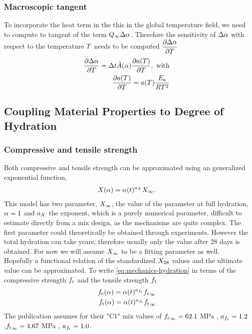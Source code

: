 \subsubsection{Macroscopic tangent}
To incorporate the heat term in the this in the global temperature field, we need to compute to tangent of the term $Q_{\infty}\Delta\alpha$.
Therefore the sensitivity of $\Delta\alpha$ with respect to the temperature $T$ needs to be computed $\dfrac{\partial \Delta\alpha}{\partial T}$
\begin{align}
	\dfrac{\partial \Delta\alpha}{\partial T} = \Delta t \tilde{A}(\alpha)\dfrac{\partial a(T)}{\partial T},\text{ with}\\
	\dfrac{\partial a(T)}{\partial T} = a(T) \frac{E_{\text{a}}}{RT^2}
\end{align}

\subsection{Coupling Material Properties to Degree of Hydration}
\subsubsection{Compressive and tensile strength}
Both compressive and tensile strength can be approximated using an generalized exponential function,
\begin{align}
	X(\alpha) = \alpha(t)^{a_X} X_\infty. \label{eq:mechanics-hydration}
\end{align}
This model has two parameter, $X_\infty$, the value of the parameter at full hydration, $\alpha = 1$ and $a_X$ the exponent, which is a purely numerical parameter, difficult to estimate directly from a mix design, as the mechanisms are quite complex.
The first parameter could theoretically be obtained through experiments.
However the total hydration can take years, therefore usually only the value after 28 days is obtained.
For now we will assume $X_\infty$ to be a fitting parameter as well.
Hopefully a functional relation of the standardized $X_{28}$ values and the ultimate value can be approximated.
To write \eqref{eq:mechanics-hydration} in terms of the compressive strength $f_{\text{c}}$ and the tensile strength $f_{\text{t}}$
\begin{align}
	f_{\text{c}}(\alpha) = \alpha(t)^{a_{f_{\text{c}}}} {f_{\text{c}}}_\infty\\
	f_{\text{t}}(\alpha) = \alpha(t)^{a_{f_{\text{t}}}} {f_{\text{t}}}_\infty\\
\end{align}
The publication assumes for their "C1" mix values of  ${f_{\text{c}}}_\infty = 62.1$ MPa , $a_{f_{\text{c}}} = 1.2$,${f_{\text{t}}}_\infty = 4.67$ MPa , $a_{f_{\text{t}}} = 1.0$.

